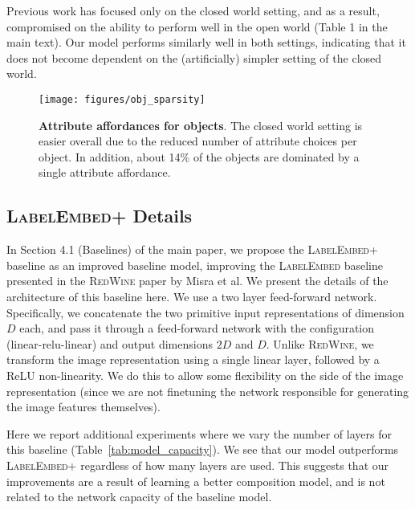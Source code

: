 \documentclass[runningheads]{llncs}
\newcommand{\SC}[1]{{\textsc{#1}}}
\newcommand{\reftbl}[1]{Table~\ref{#1}}
\begin{document}
Previous work has focused only on the closed world setting, and as a result, compromised on the ability to perform well in the open world (Table 1 in the main text). Our model performs similarly well in both settings, indicating that it does not become dependent on the (artificially) simpler setting of the closed world. 

\begin{figure}[t]
\centering
\texttt{[image: figures/obj\_sparsity]}
\caption{\textbf{Attribute affordances for objects}. The closed world setting is easier overall due to the reduced number of attribute choices per object. In addition, about 14\% of the objects are dominated by a single attribute affordance.} 
\label{fig:obj_sparsity}
\end{figure}


\subsection*{\SC{LabelEmbed+} Details}

In Section 4.1 (Baselines) of the main paper, we propose the \SC{LabelEmbed+} baseline as an improved baseline model, improving the \SC{LabelEmbed} baseline presented in the \SC{RedWine} paper by Misra et al.  We present the details of the architecture of this baseline here. We use a two layer feed-forward network. Specifically, we concatenate the two primitive input representations of dimension $D$ each, and pass it through a feed-forward network with the configuration (linear-relu-linear) and output dimensions $2D$ and $D$. Unlike \SC{RedWine}, we transform the image representation using a single linear layer, followed by a ReLU non-linearity. We do this to allow some flexibility on the side of the image representation (since we are not finetuning the network responsible for generating the image features themselves).

Here we report additional experiments where we vary the number of layers for this baseline (\reftbl{tab:model_capacity}). We see that our model outperforms \SC{LabelEmbed+} regardless of how many layers are used. This suggests that our improvements are a result of learning a better composition model, and is not related to the network capacity of the baseline model.
\end{document}
